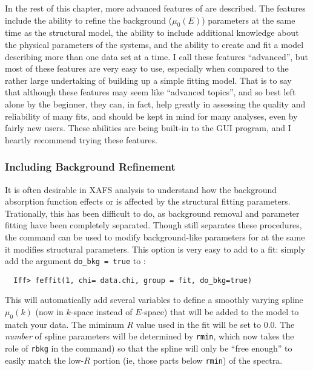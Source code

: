 In the rest of this chapter, more advanced features of {} are
described.  The features include the ability to refine the background
($\mu_0(E)$) parameters at the same time as the structural model, the
ability to include additional knowledge about the physical parameters of
the systems, and the ability to create and fit a model describing more than
one data set at a time.  I call these features ``advanced'', but most of
these features are very easy to use, especially when compared to the rather
large undertaking of building up a simple fitting model.  That is to say
that although these features may seem like ``advanced topics'', and so best
left alone by the beginner, they can, in fact, help greatly in assessing
the quality and reliability of many fits, and should be kept in mind for
many analyses, even by fairly new users.  These abilities are being
built-in to the {\artemis} GUI program, and I heartly recommend trying
these features.

\subsubsection{Including Background Refinement} \label{Ch:FEFFIT-bkg}
{}

It is often desirable in XAFS analysis to understand how the background
absorption function effects or is affected by the structural fitting
parameters.  Trationally, this has been difficult to do, as background
removal and parameter fitting have been completely separated.  Though
{\ifeffit} still separates these procedures, the {} command
can be used to modify background-like parameters for {\chik} at the same it
modifies structural parameters.   This option is very easy to add to a fit:
simply add the argument {\tt{do\_bkg = true}} to {}:
\begin{verbatim}
  Iff> feffit(1, chi= data.chi, group = fit, do_bkg=true)
\end{verbatim}
\noindent
This will automatically add several variables to define a smoothly varying
spline $\mu_0(k)$ (now in $k$-space instead of $E$-space) that will be
added to the model {\chik} to match your data.  The miminum $R$ value used
in the fit will be set to 0.0.  The {\emph{number}} of spline parameters
will be determined by {\tt{rmin}}, which now takes the role of {\tt{rbkg}}
in the {} command) so that the spline will only be ``free
enough'' to easily match the low-$R$ portion (ie, those parts below
{\tt{rmin}}) of the spectra.

